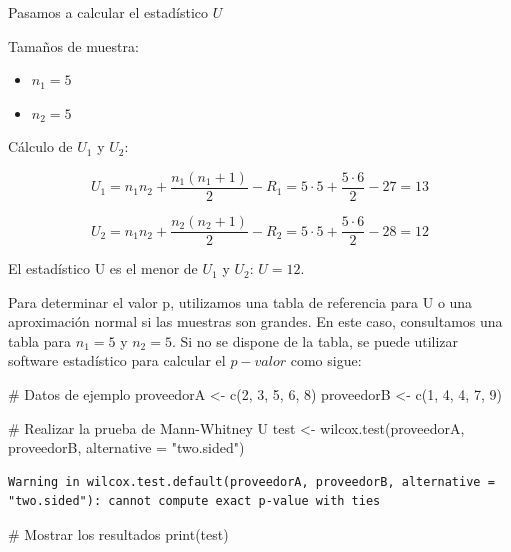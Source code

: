 \documentclass[
  letterpaper,
  DIV=11,
  numbers=noendperiod]{scrreprt}
\newenvironment{Shaded}{\begin{snugshade}}{\end{snugshade}}
\newcommand{\AttributeTok}[1]{\textcolor[rgb]{0.40,0.45,0.13}{#1}}
\newcommand{\CommentTok}[1]{\textcolor[rgb]{0.37,0.37,0.37}{#1}}
\newcommand{\DecValTok}[1]{\textcolor[rgb]{0.68,0.00,0.00}{#1}}
\newcommand{\FunctionTok}[1]{\textcolor[rgb]{0.28,0.35,0.67}{#1}}
\newcommand{\NormalTok}[1]{\textcolor[rgb]{0.00,0.23,0.31}{#1}}
\newcommand{\OtherTok}[1]{\textcolor[rgb]{0.00,0.23,0.31}{#1}}
\newcommand{\StringTok}[1]{\textcolor[rgb]{0.13,0.47,0.30}{#1}}
\providecommand{\tightlist}{%
  \setlength{\itemsep}{0pt}\setlength{\parskip}{0pt}}\usepackage{longtable,booktabs,array}
\begin{document}
\begin{tcolorbox}
Pasamos a calcular el estadístico \(U\)

Tamaños de muestra:

\begin{itemize}
\tightlist
\item
  \(n_1 = 5\)
\item
  \(n_2 = 5\)
\end{itemize}

Cálculo de \(U_1\) y \(U_2\):

\[
U_1 = n_1 n_2 + \frac{n_1 (n_1 + 1)}{2} - R_1 = 5 \cdot 5 + \frac{5 \cdot 6}{2} - 27 = 13
\]

\[
U_2 = n_1 n_2 + \frac{n_2 (n_2 + 1)}{2} - R_2 = 5 \cdot 5 + \frac{5 \cdot 6}{2} - 28 = 12
\]

El estadístico U es el menor de \(U_1\) y \(U_2\): \(U = 12\).

Para determinar el valor p, utilizamos una tabla de referencia para U o
una aproximación normal si las muestras son grandes. En este caso,
consultamos una tabla para \(n_1 = 5\) y \(n_2 = 5\). Si no se dispone
de la tabla, se puede utilizar software estadístico para calcular el
\(p-valor\) como sigue:

\begin{Shaded}
\begin{Highlighting}[]
\CommentTok{\# Datos de ejemplo}
\NormalTok{proveedorA }\OtherTok{\textless{}{-}} \FunctionTok{c}\NormalTok{(}\DecValTok{2}\NormalTok{, }\DecValTok{3}\NormalTok{, }\DecValTok{5}\NormalTok{, }\DecValTok{6}\NormalTok{, }\DecValTok{8}\NormalTok{)}
\NormalTok{proveedorB }\OtherTok{\textless{}{-}} \FunctionTok{c}\NormalTok{(}\DecValTok{1}\NormalTok{, }\DecValTok{4}\NormalTok{, }\DecValTok{4}\NormalTok{, }\DecValTok{7}\NormalTok{, }\DecValTok{9}\NormalTok{)}

\CommentTok{\# Realizar la prueba de Mann{-}Whitney U}
\NormalTok{test }\OtherTok{\textless{}{-}} \FunctionTok{wilcox.test}\NormalTok{(proveedorA, proveedorB, }\AttributeTok{alternative =} \StringTok{"two.sided"}\NormalTok{)}
\end{Highlighting}
\end{Shaded}

\begin{verbatim}
Warning in wilcox.test.default(proveedorA, proveedorB, alternative =
"two.sided"): cannot compute exact p-value with ties
\end{verbatim}

\begin{Shaded}
\begin{Highlighting}[]
\CommentTok{\# Mostrar los resultados}
\FunctionTok{print}\NormalTok{(test)}
\end{Highlighting}
\end{Shaded}


\end{tcolorbox}
\end{document}
